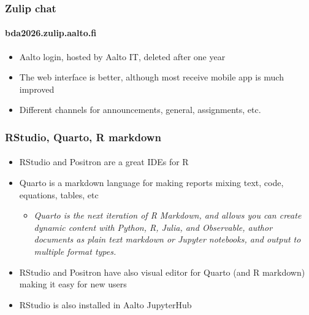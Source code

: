 \documentclass[english,t]{beamer}
\begin{document}
\begin{frame}

  \frametitle{Zulip chat}  %
  \framesubtitle{bda2026.zulip.aalto.fi}

  \begin{itemize}
  \item Aalto login, hosted by Aalto IT, deleted after one year
  \item The web interface is better, although most receive mobile app
    is much improved
  \item Different channels for announcements, general, assignments, etc.
  \end{itemize}
  
\end{frame}

\begin{frame}

  \frametitle{RStudio, Quarto, R markdown}  %
  \framesubtitle{}

  \begin{itemize}
  \item RStudio and Positron are a great IDEs for R
  \item Quarto is a markdown language for making reports mixing
    text, code, equations, tables, etc
    \begin{itemize}
    \item \textit{Quarto is the next iteration of R Markdown, and
        allows you can create dynamic content with Python, R, Julia,
        and Observable, author documents as plain text markdown or
        Jupyter notebooks, and output to multiple format types.}
    \end{itemize}
  \item RStudio and Positron have also visual editor for Quarto (and R markdown)
    making it easy for new users
  \item RStudio is also installed in Aalto JupyterHub
  \end{itemize}
  
\end{frame}  
\end{document}

